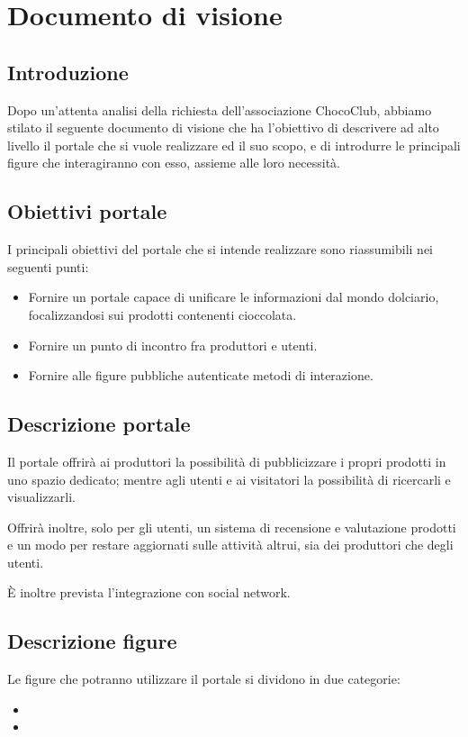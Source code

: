 \chapter{Documento di visione} 
\label{cha:documento_di_visione}

\section{Introduzione}
Dopo un'attenta analisi della richiesta dell'associazione ChocoClub, abbiamo stilato il seguente documento di visione che ha l'obiettivo di descrivere ad alto livello il portale che si vuole realizzare ed il suo scopo, e di introdurre le principali figure che interagiranno con esso, assieme alle loro necessità.

\section{Obiettivi portale} 
\label{sec:obiettivi_portale}
I principali obiettivi del portale che si intende realizzare sono riassumibili nei seguenti punti:
\begin{itemize}
	\item Fornire un portale capace di unificare le informazioni dal mondo dolciario, focalizzandosi sui prodotti contenenti cioccolata.
	\item Fornire un punto di incontro fra produttori e utenti.
	\item Fornire alle figure pubbliche autenticate metodi di interazione.
\end{itemize}

\section{Descrizione portale}
\label{sec:descrizione_portale}
Il portale offrirà ai produttori la possibilità di pubblicizzare i propri prodotti in uno spazio dedicato; mentre agli utenti e ai visitatori la possibilità di ricercarli e visualizzarli. 

Offrirà inoltre, solo per gli utenti, un sistema di recensione e valutazione prodotti e un modo per restare aggiornati sulle attività altrui, sia dei produttori che degli utenti.

È inoltre prevista l'integrazione con social network.

\section{Descrizione figure} 
\label{sec:descrizione_figure}
Le figure che potranno utilizzare il portale si dividono in due categorie:
\begin{itemize}
	\item {}
	\item {}
\end{itemize}

